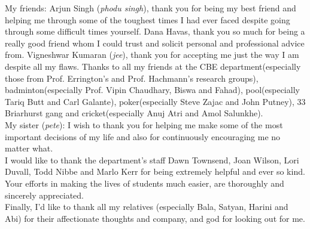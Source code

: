 \noindent My friends: Arjun Singh (\emph{phodu singh}), thank you for being my best friend and helping me through some of the toughest times I had ever faced despite going through some difficult times yourself. Dana Havas, thank you so much for being a really good friend whom I could trust and solicit personal and professional advice from. Vigneshwar Kumaran (\emph{jee}), thank you for accepting me just the way I am despite all my flaws. Thanks to all my friends at the CBE department(especially those from Prof. Errington's and Prof. Hachmann's research groups), badminton(especially Prof. Vipin Chaudhary, Biswa and Fahad), pool(especially Tariq Butt and Carl Galante), poker(especially Steve Zajac and John Putney), 33 Briarhurst gang and cricket(especially Anuj Atri and Amol Salunkhe).\\

\noindent My sister (\emph{pete}): I wish to thank you for helping me make some of the most important decisions of my life and also for continuously encouraging me no matter what.\\

\noindent I would like to thank the department's staff Dawn Townsend, Joan Wilson, Lori Duvall, Todd Nibbe and Marlo Kerr for being extremely helpful and ever so kind. Your efforts in making the lives of students much easier, are thoroughly and sincerely appreciated.\\

\noindent Finally, I'd like to thank all my relatives (especially Bala, Satyan, Harini and Abi) for their affectionate thoughts and company, and god for looking out for me.
